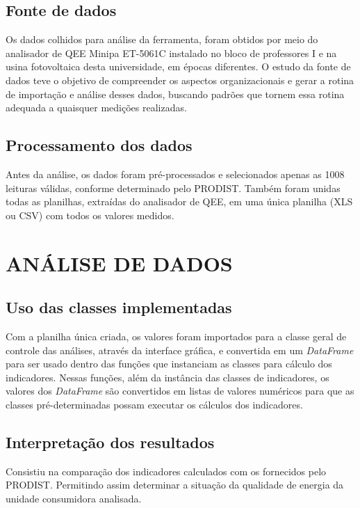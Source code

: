 \subsection{Fonte de dados}

Os dados colhidos para análise da ferramenta, foram obtidos por meio do analisador de QEE Minipa ET-5061C instalado no bloco de professores I e na usina fotovoltaica desta universidade, em épocas diferentes. O estudo da fonte de dados teve o objetivo de compreender os aspectos organizacionais e gerar a rotina de importação e análise desses dados, buscando padrões que tornem essa rotina adequada a quaisquer medições realizadas.

\subsection{Processamento dos dados}

Antes da análise, os dados foram pré-processados e selecionados apenas as 1008 leituras válidas, conforme determinado pelo PRODIST. Também foram unidas todas as planilhas, extraídas do analisador de QEE, em uma única planilha (XLS ou CSV) com todos os valores medidos.

\section{ANÁLISE DE DADOS}

\subsection{Uso das classes implementadas}

Com a planilha única criada, os valores foram importados para a classe geral de controle das análises, através da interface gráfica, e convertida em um \textit{DataFrame} para ser usado dentro das funções que instanciam as classes para cálculo dos indicadores. Nessas funções, além da instância das classes de indicadores, os valores dos \textit{DataFrame} são convertidos em listas de valores numéricos para que as classes pré-determinadas possam executar os cálculos dos indicadores.

\subsection{Interpretação dos resultados}

Consistiu na comparação dos indicadores calculados com os fornecidos pelo PRODIST. Permitindo assim determinar a situação da qualidade de energia da unidade consumidora analisada.
